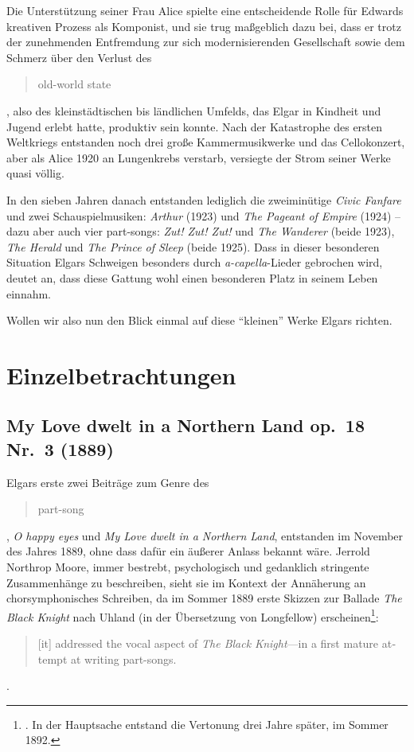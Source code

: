 \documentclass[a4paper,11pt,open=any]{scrbook}
\newcommand{\engquote}[1]{\foreignblockquote{english}{#1}}
\begin{document}
Die Unterstützung seiner Frau Alice spielte eine entscheidende Rolle für
Edwards kreativen Prozess als Komponist, und sie trug maßgeblich dazu bei,
dass er trotz der zunehmenden Entfremdung zur sich modernisierenden
Gesellschaft sowie dem Schmerz über den Verlust des \engquote{old-world
state}, also des kleinstädtischen bis ländlichen Umfelds, das Elgar in
Kindheit und Jugend erlebt hatte, produktiv sein konnte.  Nach der
Katastrophe des ersten Weltkriegs entstanden noch drei große Kammermusikwerke
und das Cellokonzert, aber als Alice 1920 an Lungenkrebs verstarb, versiegte
der Strom seiner Werke quasi völlig.

In den sieben Jahren danach entstanden lediglich die zweiminütige
\textit{Civic Fanfare} und zwei Schauspielmusiken: \textit{Arthur}
(1923) und \textit{The Pageant of Empire} (1924) – dazu aber auch vier
part-songs: \textit{Zut! Zut! Zut!} und \textit{The Wanderer} (beide 1923),
\textit{The Herald} und \textit{The Prince of Sleep} (beide 1925).  Dass in
dieser besonderen Situation Elgars Schweigen besonders durch
\textit{a-capella}-Lieder gebrochen wird, deutet an, dass diese Gattung wohl
einen besonderen Platz in seinem Leben einnahm.

Wollen wir also nun den Blick einmal auf diese \enquote{kleinen} Werke
Elgars richten.


\chapter{Einzelbetrachtungen}

\section{My Love dwelt in a Northern Land \textmd{op.~18 Nr.~3 (1889)}}

Elgars erste zwei Beiträge zum Genre des \engquote{part-song}, \textit{O
happy eyes} und \textit{My Love dwelt in a Northern Land}, entstanden im
November des Jahres 1889, ohne dass dafür ein äußerer Anlass bekannt wäre.
Jerrold Northrop Moore, immer bestrebt, psychologisch und gedanklich
stringente Zusammenhänge zu beschreiben, sieht sie im Kontext der Annäherung
an chorsymphonisches Schreiben, da im Sommer 1889 erste Skizzen zur Ballade
\textit{The Black Knight} nach Uhland (in der Übersetzung von Longfellow)
erscheinen\footnote{\cite[S.~136]{moore}.  In der Hauptsache entstand die
Vertonung drei Jahre später, im Sommer 1892.}: \engquote{[it] addressed the
vocal aspect of \textit{The Black Knight}—in a first mature attempt at
writing part-songs.}\cite[S.~141]{moore}.
\end{document}
